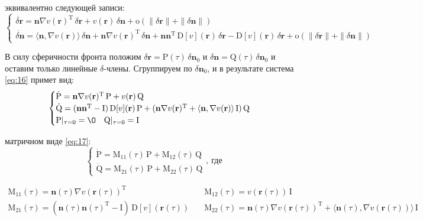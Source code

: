 \documentclass[12pt, cleqn, a4paper]{article}
\newcommand{\bfv}[1]{\mathbf{#1}}
\newcommand{\dd}[1]{\dot{#1}}
\newcommand{\dv}[1]{\nabla v(#1)}
\newcommand{\ddv}[1]{\mathrm{D}[v](#1)}
\newcommand{\dr}{\delta \bfv{r}}
\newcommand{\dn}{\delta \bfv{n}}
\newcommand{\om}[1]{\mathrm{o}(#1)}
\newcommand{\dprod}[2]{\langle #1, #2 \rangle}
\newcommand{\T}[1]{#1^\mathrm{T}}
\newcommand{\matr}[1]{\mathrm{#1}}
\begin{document}
 эквивалентно следующей записи:
\begin{equation} \label{eq:16}
\begin{cases}
\dd{\dr} = \bfv{n}\T{\dv{\bfv{r}}}\,\dr + v(\bfv{r})\,\dn + \om{\|\dr\| + \|\dn\|}\\
\dd{\dn} = \dprod{\bfv{n}}{\dv{\bfv{r}}}\,\dn + \bfv{n}\T{\dv{\bfv{r}}}\,\dn + \bfv{n}\T{\bfv{n}}\,\ddv{\bfv{r}}\,\dr - \ddv{\bfv{r}}\,\dr + \om{\|\dr\| + \|\dn\|}
\end{cases}
\end{equation}\vspace{1mm}

В силу сферичности фронта положим $\dr = \matr{P}(\tau)\,\dn_0$ и $\dn = \matr{Q}(\tau)\,\dn_0$ и оставим только линейные $\delta$-члены. Сгруппируем по $\dn_0$, и в результате система \eqref{eq:16} примет вид:
\begin{equation} \label{eq:17}
\begin{cases}
\dd{\matr{P}} = \bfv{n}\T{\dv{\bfv{r}}}\,\matr{P} + v(\bfv{r})\,\matr{Q}\\
\dd{\matr{Q}} = (\bfv{n}\T{\bfv{n}} - \matr{I})\,\ddv{\bfv{r}}\,\matr{P} + (\bfv{n}\T{\dv{\bfv{r}}} + \dprod{\bfv{n}}{\dv{\bfv{r}}}\,\matr{I})\,\matr{Q}\\
\matr{P}|_{\tau=0} = \matr{\O} \quad \matr{Q}|_{\tau=0} = \matr{I}
\end{cases}
\end{equation}

 матричном виде \eqref{eq:17}:
\begin{equation} \label{eq:18}
\begin{cases}
\dd{\matr{P}} = \matr{M}_{11}(\tau)\,\matr{P} + \matr{M}_{12}(\tau)\,\matr{Q}\\
\dd{\matr{Q}} = \matr{M}_{21}(\tau)\,\matr{P} + \matr{M}_{22}(\tau)\,\matr{Q} 
\end{cases}, \ \text{где}
\end{equation}

\begin{equation}
\begin{aligned} \label{eq:19}
\matr{M}_{11}(\tau) = \bfv{n}(\tau)\T{\dv{\bfv{r}(\tau)}} \mspace{105mu}  &\matr{M}_{12}(\tau) = v(\bfv{r}(\tau))\,\matr{I}\\
\matr{M}_{21}(\tau) = (\bfv{n}(\tau)\T{\bfv{n}(\tau)} - \matr{I})\,\ddv{\bfv{r}(\tau)} \quad &\matr{M}_{22}(\tau) = \bfv{n}(\tau)\T{\dv{\bfv{r}(\tau)}} + \dprod{\bfv{n}(\tau)}{\dv{\bfv{r}(\tau)}}\,\matr{I}
\end{aligned}
\end{equation}
\end{document}
